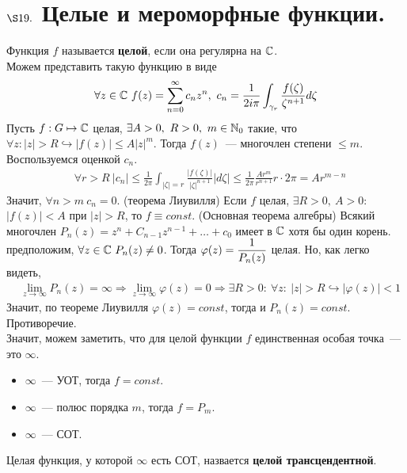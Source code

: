 \section{$\S 19.$ Целые и мероморфные функции.}
\Def
Функция $f$ называется \textbf{целой}, если она регулярна на $\mathbb{C}$.
\\
Можем представить такую функцию в виде
\begin{equation}\label{(19.1)}
    \forall z \in \mathbb{C} \ f(z) = \sum_{n=0}^\infty c_nz^n, \ c_n = \frac{1}{2i\pi}\int_{\gamma_r}\frac{f(\zeta)}{\zeta^{n+1}} d \zeta
\end{equation}
\theorem
Пусть $f:G \mapsto \mathbb{C}$ целая, $\exists A > 0, \ R > 0, \ m \in \mathbb{N}_0$ такие,
что $\forall z: \left| z \right| > R \hookrightarrow \left| f(z) \right| \leq
A\left| z \right|^m$. Тогда $f(z)$~--- многочлен степени $\leq m$.
\pr
Воспользуемся оценкой $c_n$.
\begin{align*}
  & \forall r > R \ \left|c_n \right| \leq \frac{1}{2\pi}\int_{\left| \zeta \right| = r} \frac{\left| f(\zeta) \right|}{\left| \zeta \right|^{n+1}}\left| d\zeta \right|\leq \frac{1}{2\pi}\frac{Ar^m}{r^{n+1}}r\cdot 2 \pi = Ar^{m-n}
\end{align*}
Значит, $\forall n > m \ c_n = 0$.
\corollary (теорема Лиувилля)
Если $f$ целая, $\exists R > 0, \ A > 0$: $\left| f(z) \right|< A$ при $\left| z
\right| > R$, то $f \equiv const$.
\theorem (Основная теорема алгебры)
Всякий многочлен $P_n(z) = z^n + C_{n-1}z^{n-1}+\dots+c_0$ имеет в $\mathbb{C}$ хотя бы
один корень.
\pr
предположим, $\forall z \in \mathbb{C} \ P_n(z) \neq 0$. Тогда $\varphi(z) = \displaystyle
\frac{1}{P_n(z)}$ целая. Но, как легко видеть,
\begin{align*}
  & \lim_{z \to \infty}P_n(z) = \infty \Rightarrow \lim_{z \to \infty} \varphi(z) = 0 \Rightarrow \exists R > 0: \ \forall z: \ \left| z \right| > R \hookrightarrow \left| \varphi(z) \right| < 1
\end{align*}
Значит, по теореме Лиувилля $\varphi(z) = const$, тогда и $P_n(z) = const$.
Противоречие.
\\
Значит, можем заметить, что для целой функции $f$ единственная особая точка~---
это $\infty$.
\begin{itemize}
    \item $\infty$~--- УОТ, тогда $f = const$.
    \item $\infty$~--- полюс порядка $m$, тогда $f = P_m$.
    \item $\infty$~--- СОТ.
\end{itemize}
\Def
Целая функция, у которой $\infty$ есть СОТ, назвается \textbf{целой
  трансцендентной}.
